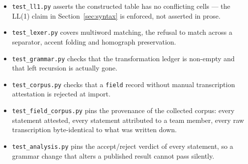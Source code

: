 \begin{itemize}[leftmargin=1.4em, itemsep=0.2em]
  \item \texttt{test\_ll1.py} asserts the constructed table has no conflicting cells --- the
        LL(1) claim in Section~\ref{sec:syntax} is enforced, not asserted in prose.
  \item \texttt{test\_lexer.py} covers multiword matching, the refusal to match across a
        separator, accent folding and homograph preservation.
  \item \texttt{test\_grammar.py} checks that the transformation ledger is non-empty and
        that left recursion is actually gone.
  \item \texttt{test\_corpus.py} checks that a \texttt{field} record without manual
        transcription attestation is rejected at import.
  \item \texttt{test\_field\_corpus.py} pins the provenance of the collected corpus: every
        statement attested, every statement attributed to a team member, every raw
        transcription byte-identical to what was written down.
  \item \texttt{test\_analysis.py} pins the accept/reject verdict of every statement, so a
        grammar change that alters a published result cannot pass silently.
\end{itemize}
